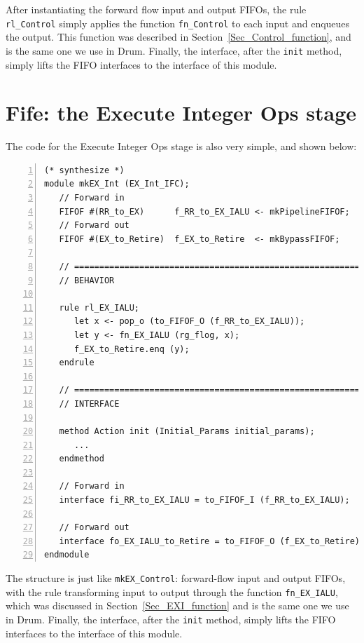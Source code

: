 After instantiating the forward flow input and output FIFOs, the rule
\verb|rl_Control| simply applies the function \verb|fn_Control| to
each input and enqueues the output.  This function was described in
Section~\ref{Sec_Control_function}, and is the same one we use in
Drum.  Finally, the interface, after the \verb|init| method, simply
lifts the FIFO interfaces to the interface of this module.


\section{Fife: the Execute Integer Ops stage}

\label{Sec_Fife_IALU_stage}

The code for the Execute Integer Ops stage is also very simple, and
shown below:

{\small
\begin{Verbatim}[frame=single, numbers=left, label=(In file:src\_Fife/S4\_EX\_Int.bsv)]
(* synthesize *)
module mkEX_Int (EX_Int_IFC);
   // Forward in
   FIFOF #(RR_to_EX)      f_RR_to_EX_IALU <- mkPipelineFIFOF;
   // Forward out
   FIFOF #(EX_to_Retire)  f_EX_to_Retire  <- mkBypassFIFOF;

   // ================================================================
   // BEHAVIOR

   rule rl_EX_IALU;
      let x <- pop_o (to_FIFOF_O (f_RR_to_EX_IALU));
      let y <- fn_EX_IALU (rg_flog, x);
      f_EX_to_Retire.enq (y);
   endrule

   // ================================================================
   // INTERFACE

   method Action init (Initial_Params initial_params);
      ...
   endmethod

   // Forward in
   interface fi_RR_to_EX_IALU = to_FIFOF_I (f_RR_to_EX_IALU);

   // Forward out
   interface fo_EX_IALU_to_Retire = to_FIFOF_O (f_EX_to_Retire);
endmodule
\end{Verbatim}
}

The structure is just like \verb|mkEX_Control|: forward-flow input and
output FIFOs, with the rule transforming input to output through the
function \verb|fn_EX_IALU|, which was discussed in
Section~\ref{Sec_EXI_function} and is the same one we use in Drum.
Finally, the interface, after the \verb|init| method, simply lifts the
FIFO interfaces to the interface of this module.

